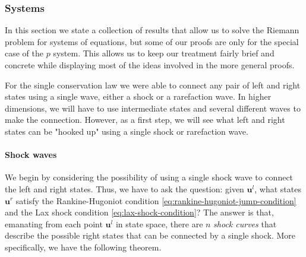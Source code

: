 \subsubsection{Systems}\label{subsec:systems-riemann-problems}

In this section we state a collection of results that allow us to solve the Riemann problem for systems of equations, but some of our proofs are only for the special case of the $p$ system. This allows us to keep our treatment fairly brief and concrete while displaying most of the ideas involved in the more general proofs.

For the single conservation law we were able to connect any pair of left and right states using a single wave, either a shock or a rarefaction wave. In higher dimensions, we will have to use intermediate states and several different waves to make the connection. However, as a first step, we will see what left and right states can be "hooked up" using a single shock or rarefaction wave.

\paragraph*{Shock waves}

We begin by considering the possibility of using a single shock wave to connect the left and right states. Thus, we have to ask the question: given $\bm{u}^l$, what states $\bm{u}^r$ satisfy the Rankine-Hugoniot condition \eqref{eq:rankine-hugoniot-jump-condition} and the Lax shock condition \eqref{eq:lax-shock-condition}? The answer is that, emanating from each point $\bm{u}^l$ in state space, there are $n$ \emph{shock curves} that describe the possible right states that can be connected by a single shock. More specifically, we have the following theorem.

